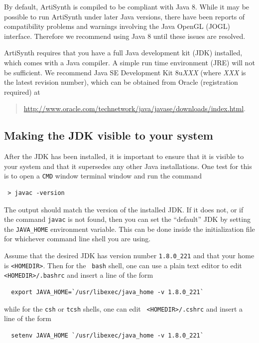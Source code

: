 By default, ArtiSynth is compiled to be compliant with Java 8. While
it may be possible to run ArtiSynth under later Java versions, there
have been reports of compatibility problems and warnings involving the
Java OpenGL (JOGL) interface. Therefore we recommend using Java 8
until these issues are resolved.

ArtiSynth requires that you have a full Java development kit (JDK)
installed, which comes with a Java compiler. A simple run time
environment (JRE) will not be sufficient. We recommend Java SE
Development Kit 8u{\it XXX} (where {\it XXX} is the latest revision
number), which can be obtained from Oracle (registration required) at
\begin{quote}
\href{http://www.oracle.com/technetwork/java/javase/downloads/index.html}%
{http://www.oracle.com/technetwork/java/javase/downloads/index.html}.
\end{quote}

\subsection{Making the JDK visible to your system}
\label{MakingJDKVisible}

After the JDK has been installed, it is important to ensure that it is
visible to your system and that it supersedes any other Java
installations. One test for this is to open a
\ifWindows
{\tt CMD} window
\else
terminal window
\fi
and run the command 
\begin{verbatim}
 > javac -version
\end{verbatim}
The output should match the version of the installed JDK. If it does
not, or if the command {\tt javac} is not found,
\ifMacOS
then you can set the ``default'' JDK by setting the {\tt JAVA\_HOME}
environment variable.  This can be done inside the
initialization file for whichever command line shell you are using.

Assume that the desired JDK has version number {\tt 1.8.0\_221} and
that your home \directory{} is {\tt <HOMEDIR>}.  Then for the {\tt
bash} shell, one can use a plain text editor to edit {\tt
<HOMEDIR>/.bashrc} and insert a line of the form
\begin{verbatim}
  export JAVA_HOME=`/usr/libexec/java_home -v 1.8.0_221`
\end{verbatim}
while for the {\tt csh} or {\tt tcsh} shells, one can edit {\tt
<HOMEDIR>/.cshrc} and insert a line of the form
\begin{verbatim}
  setenv JAVA_HOME `/usr/libexec/java_home -v 1.8.0_221`
\end{verbatim}

